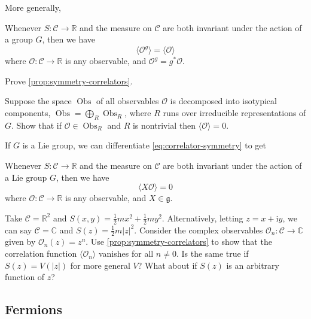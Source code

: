 \documentclass[12pt,letterpaper,reqno]{article}
\numberwithin{equation}{section}
\newcommand{\fg}{{\mathfrak g}}
\newcommand{\cC}{\ensuremath{\mathcal C}}
\newcommand{\cO}{\ensuremath{\mathcal O}}
\newcommand{\R}{\ensuremath{\mathbb R}}
\newcommand{\C}{\ensuremath{\mathbb C}}
\newcommand{\half}{\ensuremath{\frac{1}{2}}}
\newcommand{\I}{{\mathrm i}}
\newcommand{\abs}[1]{\lvert#1\rvert}
\newcommand{\IP}[1]{\langle#1\rangle}
\DeclareMathOperator{\Obs}{Obs}
\begin{document}
More generally, 
\begin{prop} \label{prop:symmetry-correlators}
Whenever $S: \cC \to \R$ and the measure on $\cC$ are both 
invariant under the action of a group $G$, then we have
\begin{equation} \label{eq:correlator-symmetry}
  \IP{\cO^g} = \IP{\cO}
\end{equation}
where $\cO: \cC \to \R$ is any observable, and $\cO^g = g^* \cO$.
\end{prop}

\begin{exercise} Prove \autoref{prop:symmetry-correlators}.
\end{exercise}

\begin{exercise}
Suppose the space $\Obs$ of all observables $\cO$ is decomposed
into isotypical components, $\Obs = \bigoplus_R \Obs_R$,
where $R$ runs over irreducible representations of $G$.
Show that if $\cO \in \Obs_R$ and $R$ is nontrivial
then $\IP{\cO} = 0$.
\end{exercise}

If $G$ is a Lie group, we can differentiate \eqref{eq:correlator-symmetry} 
to get
\begin{prop}
Whenever $S: \cC \to \R$ and the measure on $\cC$ are both 
invariant under the action of a Lie group $G$, then we have
\begin{equation}
  \IP{X \cO} = 0
\end{equation}
where $\cO: \cC \to \R$ is any observable, and $X \in \fg$.
\end{prop}

\begin{exercise}
Take $\cC = \R^2$ and $S(x,y) = \half m x^2 + \half m y^2$.
Alternatively, letting $z = x + \I y$, we can say $\cC = \C$
and $S(z) = \half m \abs{z}^2$.
Consider the complex observables $\cO_n: \cC \to \C$ given by
$\cO_n(z) = z^n$.
Use \autoref{prop:symmetry-correlators} to show that the correlation function
$\IP{\cO_n}$ vanishes for all $n \neq 0$. Is the same true if
$S(z) = V(\abs{z})$ for more general $V$? 
What about if $S(z)$ is an arbitrary function of $z$?
\end{exercise}

\subsection{Fermions}
\end{document}
